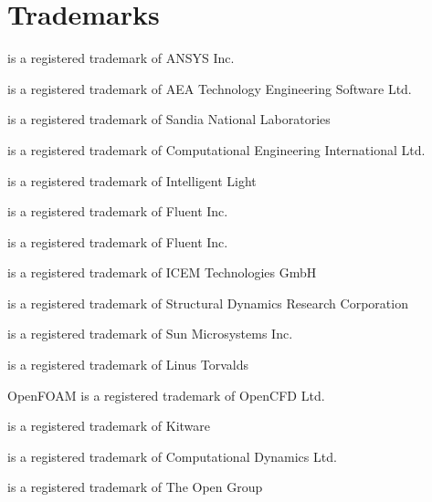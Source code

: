 
\section*{Trademarks}
 is a registered trademark of ANSYS Inc.\par
{} is a registered trademark of AEA Technology Engineering Software Ltd.\par
{} is a registered trademark of Sandia National Laboratories\par
{} is a registered trademark of Computational Engineering International Ltd.\par
{} is a registered trademark of Intelligent Light\par
{} is a registered trademark of Fluent Inc.\par
{} is a registered trademark of Fluent Inc.\par
{} is a registered trademark of ICEM Technologies GmbH\par
{} is a registered trademark of Structural Dynamics Research Corporation\par
{} is a registered trademark of Sun Microsystems Inc.\par
{} is a registered trademark of Linus Torvalds\par
OpenFOAM is a registered trademark of OpenCFD Ltd.\par
{} is a registered trademark of Kitware\par
{} is a registered trademark of Computational Dynamics Ltd.\par
{} is a registered trademark of The Open Group\par
